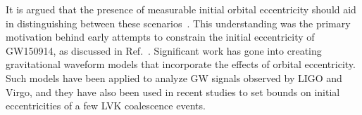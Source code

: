 \documentclass[aps,prd,twocolumn,superscriptaddress,groupedaddress,nofootinbib,showpacs,eqsecnum,useAms]{revtex4-2}
\begin{document}
It is argued that the presence of measurable initial orbital eccentricity should aid in distinguishing between these scenarios~\cite{Antonini2014, Rodriguez2016a, Wen2003, Antognini2014,Gultekin2004, OLeary2006, Haster2016, DOrazio2018, Fragione2019, Zevin2021, Breivik2016}.
This understanding was the primary motivation behind early attempts to constrain the initial eccentricity of GW150914, as discussed in Ref.~\cite{GW150914_prop}. Significant work has gone into creating gravitational waveform models that incorporate the effects of orbital eccentricity\cite{Morras2025a, planas2025b, RomeroShaw2019, Nitz2020,Romero_Shaw_2020_GW190521, gayathri2022, Wu2020, Favata2022, OShea2023, RomeroShaw2021, Gamba2022, Bonino2023, iglesias2023, Klein2010, Klein_2018, Klein2021}. Such models have been applied to analyze GW signals observed by LIGO and Virgo, and they have also been used in recent studies to set bounds on initial eccentricities of a few LVK coalescence events\cite{BBG23, Morras2025b, planas2025a}.

\end{document}
